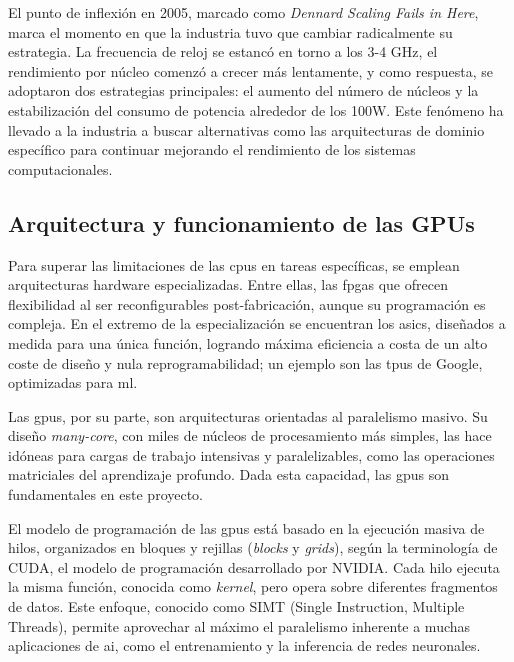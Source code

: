 \documentclass[11pt,spanish,listoffigures,listoftables]{tfgetsinf}
\begin{document}
El punto de inflexión en 2005, marcado como \textit{Dennard Scaling Fails in Here}, marca el momento en que la industria tuvo que cambiar radicalmente su estrategia. La frecuencia de reloj se estancó en torno a los 3-4 GHz, el rendimiento por núcleo comenzó a crecer más lentamente, y como respuesta, se adoptaron dos estrategias principales: el aumento del número de núcleos y la estabilización del consumo de potencia alrededor de los 100W. Este fenómeno ha llevado a la industria a buscar alternativas como las arquitecturas de dominio específico para continuar mejorando el rendimiento de los sistemas computacionales.

\subsection{Arquitectura y funcionamiento de las GPUs} \label{sec:arquitectura_gpus}

Para superar las limitaciones de las \glspl{cpu} en tareas específicas, se emplean arquitecturas hardware especializadas. Entre ellas, las \glspl{fpga} que ofrecen flexibilidad al ser reconfigurables post-fabricación, aunque su programación es compleja. En el extremo de la especialización se encuentran los \glspl{asic}, diseñados a medida para una única función, logrando máxima eficiencia a costa de un alto coste de diseño y nula reprogramabilidad; un ejemplo son las \glspl{tpu} de Google, optimizadas para \gls{ml}.

Las \glspl{gpu}, por su parte, son arquitecturas orientadas al paralelismo masivo. Su diseño \textit{many-core}, con miles de núcleos de procesamiento más simples, las hace idóneas para cargas de trabajo intensivas y paralelizables, como las operaciones matriciales del aprendizaje profundo. Dada esta capacidad, las \glspl{gpu} son fundamentales en este proyecto.

El modelo de programación de las \glspl{gpu} está basado en la ejecución masiva de hilos, organizados en bloques y rejillas (\textit{blocks} y \textit{grids}), según la terminología de CUDA\cite{cuda}, el modelo de programación desarrollado por NVIDIA\cite{nvidia_home}. Cada hilo ejecuta la misma función, conocida como \textit{kernel}, pero opera sobre diferentes fragmentos de datos. Este enfoque, conocido como SIMT (Single Instruction, Multiple Threads), permite aprovechar al máximo el paralelismo inherente a muchas aplicaciones de \gls{ai}, como el entrenamiento y la inferencia de redes neuronales.
\end{document}
